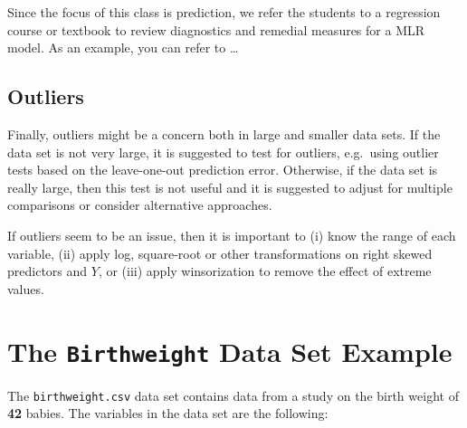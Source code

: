 \documentclass[
]{book}
\begin{document}
Since the focus of this class is prediction, we refer the students to a regression course or textbook to review diagnostics and remedial measures for a MLR model. As an example, you can refer to \ldots{}

\subsection*{Outliers}\label{outliers}

Finally, outliers might be a concern both in large and smaller data sets. If the data set is not very large, it is suggested to test for outliers, e.g.~using outlier tests based on the leave-one-out prediction error. Otherwise, if the data set is really large, then this test is not useful and it is suggested to adjust for multiple comparisons or consider alternative approaches.

If outliers seem to be an issue, then it is important to (i) know the range of each variable, (ii) apply log, square-root or other transformations on right skewed predictors and \(Y\), or (iii) apply winsorization to remove the effect of extreme values.

\section{\texorpdfstring{The \texttt{Birthweight} Data Set Example}{The Birthweight Data Set Example}}\label{the-birthweight-data-set-example}

The \texttt{birthweight.csv} data set contains data from a study on the birth weight of \textbf{42} babies. The variables in the data set are the following:
\end{document}
